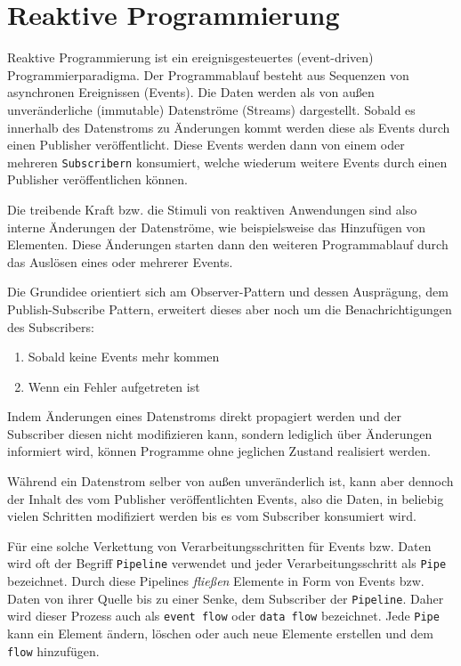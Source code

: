 \section{Reaktive Programmierung}
\label{section:reaktive_programmierung}
Reaktive Programmierung ist ein ereignisgesteuertes (event-driven) Programmierparadigma.
Der Programmablauf besteht aus Sequenzen von asynchronen Ereignissen (Events).
Die Daten werden als von außen unveränderliche (immutable) Datenströme (Streams) dargestellt.
Sobald es innerhalb des Datenstroms zu Änderungen kommt werden diese als Events durch einen Publisher veröffentlicht.
Diese Events werden dann von einem oder mehreren \verb|Subscribern| konsumiert, welche wiederum weitere Events durch einen
Publisher veröffentlichen können.

Die treibende Kraft bzw. die Stimuli von reaktiven Anwendungen sind also interne Änderungen der Datenströme, wie beispielsweise das
Hinzufügen von Elementen.
Diese Änderungen starten dann den weiteren Programmablauf durch das Auslösen eines oder mehrerer Events.

Die Grundidee orientiert sich am Observer-Pattern und dessen Ausprägung, dem Publish-Subscribe Pattern, erweitert dieses aber
noch um die Benachrichtigungen des Subscribers:
\begin{enumerate}
  \item Sobald keine Events mehr kommen
  \item Wenn ein Fehler aufgetreten ist
\end{enumerate}
Indem Änderungen eines Datenstroms direkt propagiert werden und der Subscriber diesen nicht modifizieren kann, sondern lediglich über Änderungen informiert wird,
können Programme ohne jeglichen Zustand realisiert werden\parencite{Escoffier2017}.

Während ein Datenstrom selber von außen unveränderlich ist, kann aber dennoch der Inhalt
des vom Publisher veröffentlichten Events, also die Daten, in beliebig vielen Schritten modifiziert werden bis es vom
Subscriber konsumiert wird.

Für eine solche Verkettung von Verarbeitungsschritten für Events bzw. Daten
wird oft der Begriff \verb|Pipeline| verwendet und jeder Verarbeitungsschritt als \verb|Pipe| bezeichnet.
Durch diese Pipelines \textit{fließen} Elemente in Form von Events bzw. Daten von ihrer Quelle
bis zu einer Senke, dem Subscriber der \verb|Pipeline|.
Daher wird dieser Prozess auch als \verb|event flow| oder \verb|data flow| bezeichnet.
Jede \verb|Pipe| kann ein Element ändern, löschen oder auch neue Elemente erstellen und dem \verb|flow| hinzufügen.


